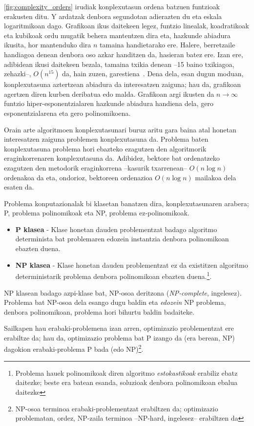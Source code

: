 \documentclass[eu]{ifirak}\usepackage[]{graphicx}\usepackage[]{color}
\newcommand{\zkk}{\guillemotleft}
\newcommand{\skk}{\guillemotright}
\begin{document}
\ref{fig:complexity_orders} irudiak konplexutasun ordena batzuen funtzioak erakusten ditu. Y ardatzak denbora segundotan adierazten du eta eskala logaritmikoan dago. Grafikoan ikus daitekeen legez, funtzio linealak, koadratikoak eta kubikoak ordu mugatik behera mantentzen dira eta, hazkunde abiadura ikusita, hor mantenduko dira $n$ tamaina handietarako ere. Halere, berretzaile handiagoa denean denbora oso azkar handitzen da, hasieran batez ere. Izan ere, adibidean ikusi daitekeen bezala, tamaina txikia denean --15 baino txikiagoa, zehazki--, $O(n^{15})$ da, hain zuzen, \zkk garestiena\skk\ . Dena dela, esan dugun moduan, konplexutasuna aztertzean abiadura da interesatzen zaiguna; hau da, grafikoan agertzen diren kurben deribatua edo malda. Grafikoan argi ikusten da $n\rightarrow \infty$ funtzio hiper-esponentzialaren hazkunde abiadura handiena dela, gero esponentzialarena eta gero polinomikoena.

Orain arte algoritmoen konplexutasunari buruz aritu gara baina atal honetan interesatzen zaiguna problemen konplexutasuna da. Problema baten konplexutasuna problema hori ebazteko ezagutzen den algoritmorik eraginkorrenaren konplexutasuna da. Adibidez, bektore bat ordenatzeko ezagutzen den metodorik eraginkorrena --kasurik txarrenean-- $O(n\log n)$ ordenakoa da eta, ondorioz, bektoreen ordenazioa $O(n\log n)$ mailakoa dela esaten da.

Problema konputazionalak bi klasetan banatzen dira, konplexutasunaren arabera; P, problema polinomikoak eta NP, problema ez-polinomikoak.

\begin{itemize}
\item \textbf{P klasea} - Klase honetan dauden problementzat badago algoritmo determinista bat problemaren edozein instantzia denbora polinomikoan ebazten duena.
\item \textbf{NP klasea} - Klase honetan dauden problementzat ez da existitzen algoritmo deterministarik problema denbora polinomikoan ebazten duena.\footnote{Problema hauek polinomikoak diren algoritmo \textit{estokastikoak} erabiliz ebatz daitezke; beste era batean esanda, soluzioak denbora polinomikoan ebalua daitezke}.
\end{itemize}

NP klasean badago azpi-klase bat, NP-osoa deritzona (\textit{NP-complete}, ingelesez). Problema bat NP-osoa dela esango dugu baldin eta \textit{edozein} NP problema, denbora polinomikoan, problema hori bihurtu baldin badaiteke.

Sailkapen hau erabaki-problemena izan arren, optimizazio problementzat ere erabiltze da; hau da, optimizazio problema bat P izango da (era berean, NP) dagokion erabaki-problema P bada (edo NP)\footnote{NP-osoa terminoa erabaki-problementzat erabiltzen da; optimizazio problematan, ordez, NP-zaila terminoa --NP-hard, ingelesez-- erabiltzen da}.
\end{document}
